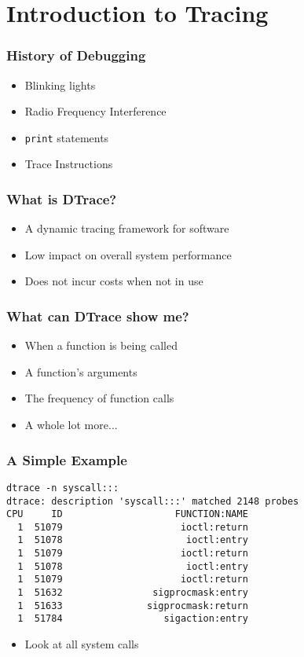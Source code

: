 \documentclass[pdftex]{beamer} %
\begin{document}
\section{Introduction to Tracing}
\label{sec:intro-tracing}

\begin{frame}[fragile]
	\frametitle{History of Debugging}
	\begin{itemize}
	\item Blinking lights
	\item Radio Frequency Interference
	\item \verb|print| statements
	\item Trace Instructions
	\end{itemize}
\end{frame}

\begin{frame}
  \frametitle{What is DTrace?}
  \begin{itemize}
  \item A dynamic tracing framework for software
  \item Low impact on overall system performance
  \item Does not incur costs when not in use
  \end{itemize}
\end{frame}

\begin{frame}
  \frametitle{What can DTrace show me?}
  \begin{itemize}
  \item When a function is being called
  \item A function's arguments
  \item The frequency of function calls
  \item A whole lot more...
  \end{itemize}
\end{frame}

\begin{frame}[fragile]
  \frametitle{A Simple Example}
  \begin{lstlisting}
dtrace -n syscall:::
dtrace: description 'syscall:::' matched 2148 probes
CPU     ID                    FUNCTION:NAME
  1  51079                     ioctl:return 
  1  51078                      ioctl:entry 
  1  51079                     ioctl:return 
  1  51078                      ioctl:entry 
  1  51079                     ioctl:return 
  1  51632                sigprocmask:entry 
  1  51633               sigprocmask:return 
  1  51784                  sigaction:entry 
  \end{lstlisting}
  \begin{itemize}
  \item Look at all system calls
  \end{itemize}
\end{frame}
\end{document}
